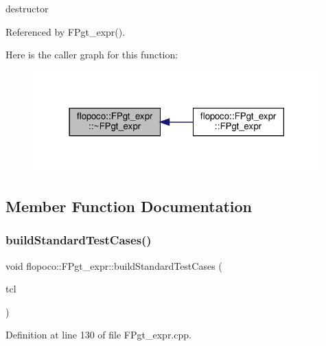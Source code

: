 destructor 



Referenced by F\+Pgt\+\_\+expr().

Here is the caller graph for this function\+:
\nopagebreak
\begin{figure}[H]
\begin{center}
\leavevmode
\includegraphics[width=314pt]{db/deb/classflopoco_1_1FPgt__expr_a9180f465b46d47f3c16bb156dc3f89a6_icgraph}
\end{center}
\end{figure}


\subsection{Member Function Documentation}
\mbox{\label{classflopoco_1_1FPgt__expr_a85e2958edaad0ca50a44744f5113636e}} 
\subsubsection{\texorpdfstring{build\+Standard\+Test\+Cases()}{buildStandardTestCases()}}
{\footnotesize\ttfamily void flopoco\+::\+F\+Pgt\+\_\+expr\+::build\+Standard\+Test\+Cases (\begin{DoxyParamCaption}\item[{Test\+Case\+List $\ast$}]{tcl }\end{DoxyParamCaption})\hspace{0.3cm}{\ttfamily [override]}}



Definition at line 130 of file F\+Pgt\+\_\+expr.\+cpp.

\mbox{\label{classflopoco_1_1FPgt__expr_ad76819c6f9549929336a4cf625169004}} 
